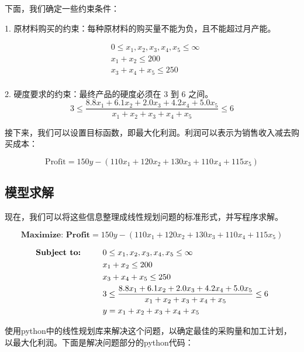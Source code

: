 \documentclass[a4,10pt,zihao=-4]{ctexart}
\begin{document}
下面，我们确定一些约束条件：

1. 原材料购买的约束：每种原材料的购买量不能为负，且不能超过月产能。
 
\begin{align*}
&0 \leq x_1, x_2, x_3, x_4, x_5 \leq \infty \\
&x_1 + x_2 \leq 200 \\
&x_3 + x_4 + x_5 \leq 250 \\
\end{align*}
 

2. 硬度要求的约束：最终产品的硬度必须在 3 到 6 之间。
\[
3 \leq \frac{8.8x_1 + 6.1x_2 + 2.0x_3 + 4.2x_4 + 5.0x_5}{x_1 + x_2 + x_3 + x_4 + x_5} \leq 6
\]

接下来，我们可以设置目标函数，即最大化利润。利润可以表示为销售收入减去购买成本：

\[
\text{Profit} = 150y - (110x_1 + 120x_2 + 130x_3 + 110x_4 + 115x_5)
\]


\subsection{模型求解}
现在，我们可以将这些信息整理成线性规划问题的标准形式，并写程序求解。

\[ 
\textbf{Maximize: Profit} = 150y - (110x_1 + 120x_2 + 130x_3 + 110x_4 + 115x_5) 
\]


\begin{align*}
\textbf{Subject to:\,\,\,\,\,\,\,\,\,\,\,\,\,\,}
&0 \leq x_1, x_2, x_3, x_4, x_5  \leq \infty \\ 
&x_1 + x_2 \leq 200 \\
&x_3 + x_4 + x_5 \leq 250 \\
&3 \leq \frac{8.8x_1 + 6.1x_2 + 2.0x_3 + 4.2x_4 + 5.0x_5}{x_1 + x_2 + x_3 + x_4 + x_5} \leq 6 \\
& y = x_1 + x_2 + x_3 + x_4 + x_5
\end{align*}


使用python中的线性规划库来解决这个问题，以确定最佳的采购量和加工计划，以最大化利润。下面是解决问题部分的python代码：



\end{document}
